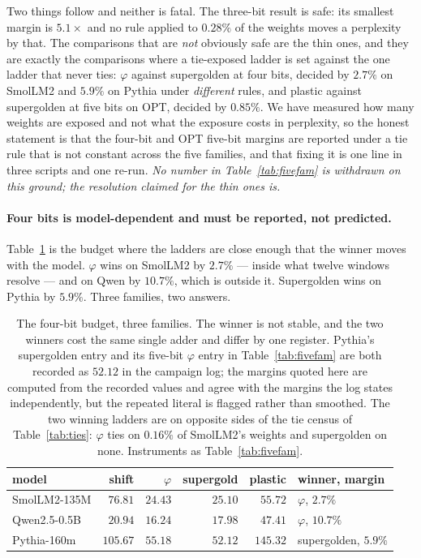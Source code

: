 \documentclass[11pt]{article}
\theoremstyle{definition}
\begin{document}
Two things follow and neither is fatal. The three-bit result is safe: its
smallest margin is $5.1\times$ and no rule applied to $0.28\%$ of the weights
moves a perplexity by that. The comparisons that are \emph{not} obviously safe
are the thin ones, and they are exactly the comparisons where a tie-exposed
ladder is set against the one ladder that never ties: $\varphi$ against
supergolden at four bits, decided by $2.7\%$ on SmolLM2 and $5.9\%$ on Pythia
under \emph{different} rules, and plastic against supergolden at five bits on
OPT, decided by $0.85\%$. We have measured how many weights are exposed and not
what the exposure costs in perplexity, so the honest statement is that the
four-bit and OPT five-bit margins are reported under a tie rule that is not
constant across the five families, and that fixing it is one line in three
scripts and one re-run. \emph{No number in Table~\ref{tab:fivefam} is withdrawn
on this ground; the resolution claimed for the thin ones is.}

\paragraph{Four bits is model-dependent and must be reported, not predicted.}
Table~\ref{tab:fourbit} is the budget where the ladders are close enough that
the winner moves with the model. $\varphi$ wins on SmolLM2 by $2.7\%$ --- inside
what twelve windows resolve --- and on Qwen by $10.7\%$, which is outside it.
Supergolden wins on Pythia by $5.9\%$. Three families, two answers.

\begin{table}[t]\centering
\caption{The four-bit budget, three families. The winner is not stable, and the
two winners cost the same single adder and differ by one register. Pythia's
supergolden entry and its five-bit $\varphi$ entry in Table~\ref{tab:fivefam}
are both recorded as $52.12$ in the campaign log; the margins quoted here are
computed from the recorded values and agree with the margins the log states
independently, but the repeated literal is flagged rather than smoothed. The
two winning ladders are on opposite sides of the tie census of
Table~\ref{tab:ties}: $\varphi$ ties on $0.16\%$ of SmolLM2's weights and
supergolden on none. Instruments as Table~\ref{tab:fivefam}.}
\label{tab:fourbit}
\begin{tabular}{lrrrrl}
\toprule
model & shift & $\varphi$ & supergold & plastic & winner, margin \\
\midrule
SmolLM2-135M & $76.81$  & $\mathbf{24.43}$ & $25.10$ & $55.72$  & $\varphi$, $2.7\%$ \\
Qwen2.5-0.5B & $20.94$  & $\mathbf{16.24}$ & $17.98$ & $47.41$  & $\varphi$, $10.7\%$ \\
Pythia-160m  & $105.67$ & $55.18$ & $\mathbf{52.12}$ & $145.32$ & supergolden, $5.9\%$ \\
\bottomrule
\end{tabular}
\end{table}
\end{document}

